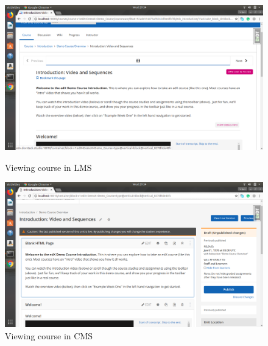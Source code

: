 \begin{figure}[ht]
  \centering
  \includegraphics[width=\textwidth]{images/devstack_2}
  \caption{Viewing course in LMS}

  \vspace*{\floatsep}

  \includegraphics[width=\textwidth]{images/devstack_3}
  \caption{Viewing course in CMS}
\end{figure}



